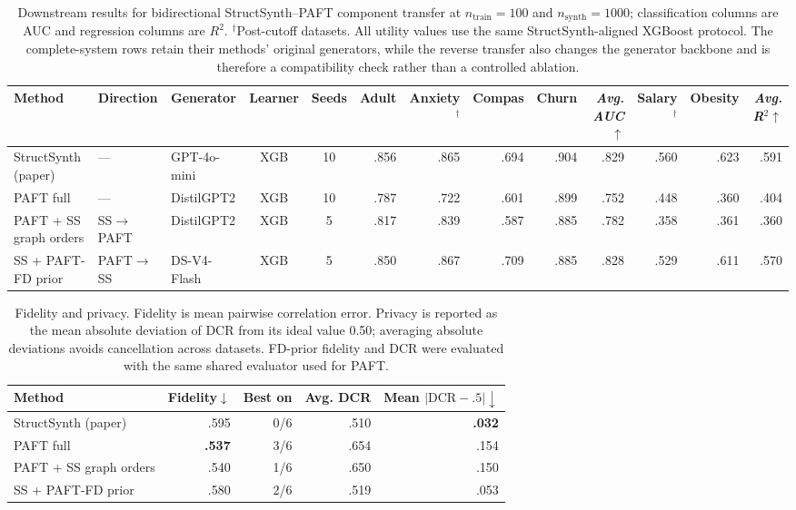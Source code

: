 
\begin{table}[t]
\centering
\scriptsize
\setlength{\tabcolsep}{2.5pt}
\begin{tabular}{lllccrrrrrrrr}
\toprule
Method & Direction & Generator & Learner & Seeds
  & Adult & Anxiety$^\dagger$ & Compas & Churn & \textit{Avg. AUC}$\uparrow$
  & Salary$^\dagger$ & Obesity & \textit{Avg. R$^2$}$\uparrow$ \\
\midrule
StructSynth (paper)
  & --- & GPT-4o-mini & XGB & 10
  & .856 & .865 & .694 & .904 & .829 & .560 & .623 & .591 \\
PAFT full
  & --- & DistilGPT2 & XGB & 10
  & .787 & .722 & .601 & .899 & .752 & .448 & .360 & .404 \\
PAFT + SS graph orders
  & SS$\to$PAFT & DistilGPT2 & XGB & 5
  & .817 & .839 & .587 & .885 & .782 & .358 & .361 & .360 \\
SS + PAFT-FD prior
  & PAFT$\to$SS & DS-V4-Flash & XGB & 5
  & .850 & .867 & .709 & .885 & .828 & .529 & .611 & .570 \\
\bottomrule
\end{tabular}
\caption{Downstream results for bidirectional StructSynth--PAFT component transfer at
$n_{\mathrm{train}}=100$ and $n_{\mathrm{synth}}=1000$; classification columns are AUC
and regression columns are $R^2$. $^\dagger$Post-cutoff datasets. All utility values
use the same StructSynth-aligned XGBoost protocol. The complete-system rows retain
their methods' original generators, while the reverse transfer also changes the
generator backbone and is therefore a compatibility check rather than a controlled
ablation.}
\label{tab:cross-validation}
\end{table}

\begin{table}[t]
\centering
\small
\begin{tabular}{lrrrr}
\toprule
Method & Fidelity$\downarrow$ & Best on & Avg. DCR & Mean $|\mathrm{DCR}-.5|\downarrow$ \\
\midrule
StructSynth (paper)   & .595 & 0/6 & .510 & \textbf{.032} \\
PAFT full             & \textbf{.537} & 3/6 & .654 & .154 \\
PAFT + SS graph orders& .540 & 1/6 & .650 & .150 \\
SS + PAFT-FD prior    & .580 & 2/6 & .519 & .053 \\
\bottomrule
\end{tabular}
\caption{Fidelity and privacy. Fidelity is mean pairwise correlation error. Privacy is
reported as the mean absolute deviation of DCR from its ideal value 0.50; averaging
absolute deviations avoids cancellation across datasets. FD-prior fidelity and DCR
were evaluated with the same shared evaluator used for PAFT.}
\label{tab:cross-fidelity-privacy}
\end{table}

